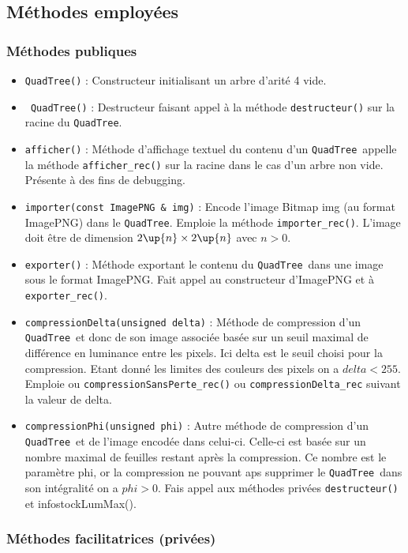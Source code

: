 \documentclass{article}
\newcommand{\info}{\texttt}
\newcommand{\qt}{\info{QuadTree}}
\begin{document}
	\subsection{Méthodes employées}
	
	\subsubsection{Méthodes publiques}
	
	\begin{itemize}
		\item \info{QuadTree()} : Constructeur initialisant un arbre d'arité 4 vide.
		\item \info{~QuadTree()} : Destructeur faisant appel à la méthode \info{destructeur()} sur la racine du \qt.
		\item \info{afficher()} : Méthode d'affichage textuel du contenu d'un \qt\, appelle la méthode \info{afficher\_rec()} sur la racine dans le cas d'un arbre non vide. Présente à des fins de debugging.
		\item \info{importer(const ImagePNG \& img)} : Encode l'image Bitmap img (au format ImagePNG) dans le \qt. Emploie la méthode \info{importer\_rec()}. L'image doit être de dimension $2\up{n}\times2\up{n}$ avec $n>0$.
		\item \info{exporter()} : Méthode exportant le contenu du \qt\ dans une image sous le format ImagePNG. Fait appel au constructeur d'ImagePNG et à \info{exporter\_rec()}.
		\item \info{compressionDelta(unsigned delta)} : Méthode de compression d'un \qt\ et donc de son image associée basée sur un seuil maximal de différence en luminance entre les pixels. Ici delta est le seuil choisi pour la compression. Etant donné les limites des couleurs des pixels on a $delta<255$. Emploie ou \info{compressionSansPerte\_rec()} ou \info{compressionDelta\_rec} suivant la valeur de delta.
		\item \info{compressionPhi(unsigned phi)} : Autre méthode de compression d'un \qt\ et de l'image encodée dans celui-ci. Celle-ci est basée sur un nombre maximal de feuilles restant après la compression. Ce nombre est le paramètre phi, or la compression ne pouvant aps supprimer le \qt\ dans son intégralité on a $phi>0$. Fais appel aux méthodes privées \info{destructeur()} et info{stockLumMax()}.
	\end{itemize}
	
	\subsubsection{Méthodes facilitatrices (privées)}
	
\end{document}
